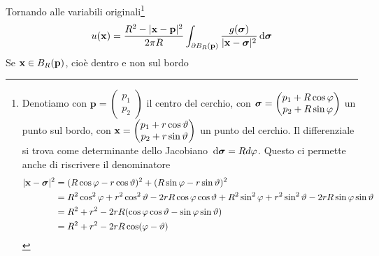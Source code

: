 \begin{dimostrazione}
    Tornando alle variabili originali\footnote{Denotiamo con $\mathbf{p} =
            \begin{pmatrix}
                p_{1} \\
                p_{2}
            \end{pmatrix}$ il centro del cerchio, con $\sigg =
            \begin{pmatrix}
                p_{1} +R\cos \varphi \\
                p_{2} +R\sin \varphi
            \end{pmatrix}$ un punto sul bordo, con $\x =
            \begin{pmatrix}
                p_{1} +r\cos \vartheta \\
                p_{2} +r\sin \vartheta
            \end{pmatrix}$ un punto del cerchio. Il differenziale si trova come determinante dello Jacobiano $\dsig =Rd\varphi $. Questo ci permette anche di riscrivere il denominatore
        \begin{align*}
            | \x -\sigg| ^{2} & =(R\cos \varphi -r\cos \vartheta)^{2} +(R\sin \varphi -r\sin \vartheta)^{2}                                                                                     \\
                              & =R^{2}\cos^{2} \varphi +r^{2}\cos^{2} \vartheta -2rR\cos \varphi \cos \vartheta +R^{2}\sin^{2} \varphi +r^{2}\sin^{2} \vartheta -2rR\sin \varphi \sin \vartheta \\
                              & =R^{2} +r^{2} -2rR(\cos \varphi \cos \vartheta -\sin \varphi \sin \vartheta)                                                                                    \\
                              & =R^{2} +r^{2} -2rR\cos(\varphi -\vartheta)
        \end{align*}}
    \begin{equation}
        u(\x) =\frac{R^{2} -| \x -\mathbf{p}| ^{2}}{2\pi R}\int _{\partial B_{R}(\mathbf{p})}\frac{g(\sigg)}{| \x -\sigg| ^{2}} \dsig
        \label{eq:poisson-cerchio-dim}
    \end{equation}
    Se $\x \in B_{R}(\mathbf{p})$, cioè dentro e non sul bordo

    \begin{figure}[H]
        \centering


        \begin{tikzpicture}[x=0.75pt,y=0.75pt,yscale=-1,xscale=1]


\end{tikzpicture}
\end{figure}
\end{dimostrazione}
